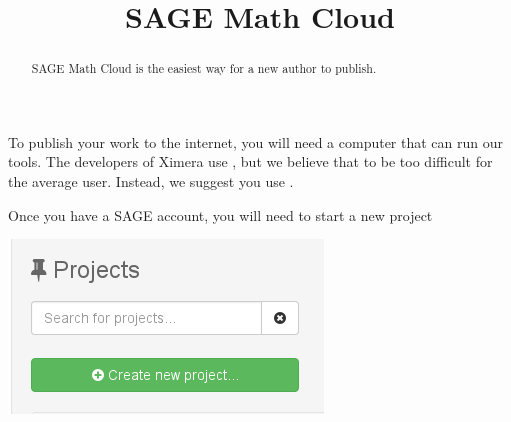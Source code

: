 \documentclass{ximera}
\title{SAGE Math Cloud}
\begin{document}
\begin{abstract}
SAGE Math Cloud is the easiest way for a new author to publish.
\end{abstract}
\maketitle

To publish your work to the internet, you will need a computer that
can run our tools. The developers of Ximera use , but we believe that to be too difficult for the average user. Instead, we suggest you use .

Once you have a SAGE account, you will need to start a new project

\begin{image}
  \includegraphics{createNewProject.png}
\end{image}
\end{document}
